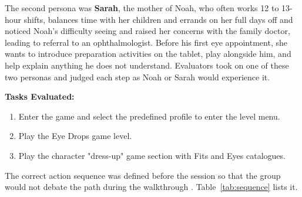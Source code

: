 \documentclass{article}
\begin{document}
The second persona was \textbf{Sarah}, the mother of Noah, who often works 12 to 13-hour shifts, 
balances time with her children and errands on her full days off and noticed Noah's difficulty 
seeing and raised her concerns with the family doctor, leading to referral to an ophthalmologist. 
Before his first eye appointment, she wants to introduce preparation activities on the tablet, 
play alongside him, and help explain anything he does not understand. Evaluators took on one of 
these two personas and judged each step as Noah or Sarah would experience it. 

\textbf{Tasks Evaluated:}
\begin{enumerate}
    \item Enter the game and select the predefined profile to enter the level menu.
    \item Play the Eye Drops game level.
    \item Play the character "dress-up" game section with Fits and Eyes catalogues.
\end{enumerate}

The correct action sequence was defined before the session so that the group would not debate 
the path during the walkthrough \cite{nng-workshop}. Table~\ref{tab:sequence} lists it.
\end{document}
